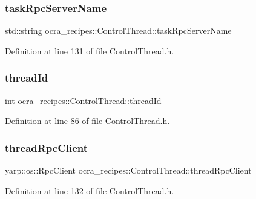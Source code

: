 \subsubsection{\texorpdfstring{task\+Rpc\+Server\+Name}{taskRpcServerName}}
{\footnotesize\ttfamily std\+::string ocra\+\_\+recipes\+::\+Control\+Thread\+::task\+Rpc\+Server\+Name\hspace{0.3cm}{\ttfamily [protected]}}



Definition at line 131 of file Control\+Thread.\+h.

\hypertarget{classocra__recipes_1_1ControlThread_abbcc309053e54da8531c77bac2dd1656}{}\label{classocra__recipes_1_1ControlThread_abbcc309053e54da8531c77bac2dd1656} 
\subsubsection{\texorpdfstring{thread\+Id}{threadId}}
{\footnotesize\ttfamily int ocra\+\_\+recipes\+::\+Control\+Thread\+::thread\+Id}



Definition at line 86 of file Control\+Thread.\+h.

\hypertarget{classocra__recipes_1_1ControlThread_a7c63f87c66ca64787e6f798a7db28e20}{}\label{classocra__recipes_1_1ControlThread_a7c63f87c66ca64787e6f798a7db28e20} 
\subsubsection{\texorpdfstring{thread\+Rpc\+Client}{threadRpcClient}}
{\footnotesize\ttfamily yarp\+::os\+::\+Rpc\+Client ocra\+\_\+recipes\+::\+Control\+Thread\+::thread\+Rpc\+Client\hspace{0.3cm}{\ttfamily [protected]}}



Definition at line 132 of file Control\+Thread.\+h.

\hypertarget{classocra__recipes_1_1ControlThread_af9d8abd531163281ac938eeb0ba51979}{}\label{classocra__recipes_1_1ControlThread_af9d8abd531163281ac938eeb0ba51979} 
